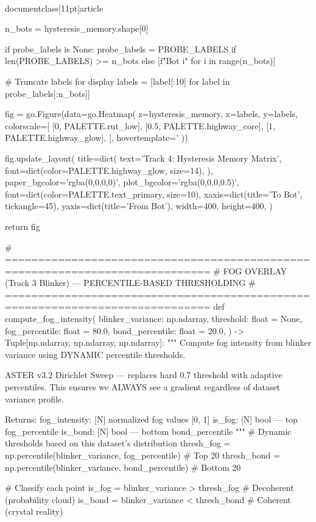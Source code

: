 \\documentclass[11pt]{article}
\begin{document}
\begin{CodeBlock}
{{{    n_bots = hysteresis_memory.shape[0]

    if probe_labels is None:
        probe_labels = PROBE_LABELS if len(PROBE_LABELS) >= n_bots else [f"Bot {i}" for i in range(n_bots)]

    # Truncate labels for display
    labels = [label[:10] for label in probe_labels[:n_bots]]

    fig = go.Figure(data=go.Heatmap(
        z=hysteresis_memory,
        x=labels,
        y=labels,
        colorscale=[
            [0, PALETTE.rut_low],
            [0.5, PALETTE.highway_core],
            [1, PALETTE.highway_glow],
        ],
        hovertemplate='%
    ))

    fig.update_layout(
        title=dict(
            text='Track 4: Hysteresis Memory Matrix',
            font=dict(color=PALETTE.highway_glow, size=14),
        ),
        paper_bgcolor='rgba(0,0,0,0)',
        plot_bgcolor='rgba(0,0,0,0.5)',
        font=dict(color=PALETTE.text_primary, size=10),
        xaxis=dict(title='To Bot', tickangle=45),
        yaxis=dict(title='From Bot'),
        width=400,
        height=400,
    )

    return fig


# =============================================================================
# FOG OVERLAY (Track 3 Blinker) — PERCENTILE-BASED THRESHOLDING
# =============================================================================
def compute_fog_intensity(
    blinker_variance: np.ndarray,
    threshold: float = None,
    fog_percentile: float = 80.0,
    bond_percentile: float = 20.0,
) -> Tuple[np.ndarray, np.ndarray, np.ndarray]:
    """
    Compute fog intensity from blinker variance using DYNAMIC percentile thresholds.

    ASTER v3.2 Dirichlet Sweep — replaces hard 0.7 threshold with adaptive percentiles.
    This ensures we ALWAYS see a gradient regardless of dataset variance profile.

    Returns:
        fog_intensity: [N] normalized fog values [0, 1]
        is_fog: [N] bool — top fog_percentile%
        is_bond: [N] bool — bottom bond_percentile%
    """
    # Dynamic thresholds based on this dataset's distribution
    thresh_fog = np.percentile(blinker_variance, fog_percentile)   # Top 20%
    thresh_bond = np.percentile(blinker_variance, bond_percentile)  # Bottom 20%

    # Classify each point
    is_fog = blinker_variance > thresh_fog      # Decoherent (probability cloud)
    is_bond = blinker_variance < thresh_bond    # Coherent (crystal reality)

}}}
\end{CodeBlock}
\end{document}
